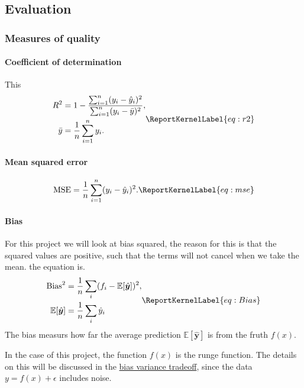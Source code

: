 \documentclass[aps,rmp,reprint,amsmath,amssymb,longbibliography]{revtex4-1}
\let\label\ReportKernelLabel
\begin{document}
\subsection{Evaluation}

\subsubsection{Measures of quality}
\label{sec:PF}
\paragraph{Coefficient of determination}
This
\begin{equation}
\begin{aligned}
R^2 &= 1-\frac{\sum_{i=1}^{n}(y_i-\hat{y}_i)^2}
          {\sum_{i=1}^{n}(y_i-\bar{y})^2},
\\
\bar{y} &= \frac{1}{n}\sum_{i=1}^{n}y_i.
\end{aligned}
\label{eq:r2}
\end{equation}

\paragraph{Mean squared error}
\begin{equation}
\mathrm{MSE}
= \frac{1}{n}\sum_{i=1}^{n}(y_i-\hat{y}_i)^2.
\label{eq:mse}
\end{equation}

\paragraph{Bias}
For this project we will look at bias squared, the reason for this
is that the squared values are positive, such that the terms will not
cancel when we take the mean. the equation is.
\begin{equation}
  \begin{aligned}
  \mathrm{Bias}^2 &= \frac{1}{n}\sum_{i}(f_i - \mathbb{E}[\hat{\boldsymbol{y}}])^2, \\
  \mathbb{E}[\hat{\boldsymbol{y}}] &= \frac{1}{n}\sum_{i} \hat{y}_i
  \end{aligned}
  \label{eq:Bias}
\end{equation}
The bias measurs how far the average prediction $\mathbb{E}[\hat{\boldsymbol{y}}]$
is from the fruth $f(x)$. \cite[p.~61-62]{LectureNotes}

In the case of this project, the function $f(x)$ is the runge function.
The details on this will be discussed in the \hyperref[sec:BV]{bias variance tradeoff},
since the data $y = f(x) + \epsilon$ includes noise.
\end{document}
